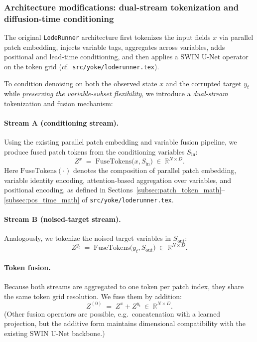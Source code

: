 \documentclass{article} %
\begin{document}
\subsubsection{Architecture modifications: dual-stream tokenization and diffusion-time conditioning}
\label{subsec:arch_mods}

The original \texttt{LodeRunner} architecture first tokenizes the input fields $x$ via parallel patch embedding,
injects variable tags, aggregates across variables, adds positional and lead-time conditioning, and then
applies a SWIN U-Net operator on the token grid (cf.\ \texttt{src/yoke/loderunner.tex}).

To condition denoising on both the observed state $x$ and the corrupted target $y_t$ while \emph{preserving the
variable-subset flexibility}, we introduce a \emph{dual-stream} tokenization and fusion mechanism:

\paragraph{Stream A (conditioning stream).}
Using the existing parallel patch embedding and variable fusion pipeline, we produce fused patch tokens
from the conditioning variables $S_{\mathrm{in}}$:
\[
Z^{x} \;=\; \mathrm{FuseTokens}\big(x,S_{\mathrm{in}}\big)\ \in\ \mathbb{R}^{N\times D}.
\]
Here $\mathrm{FuseTokens}(\cdot)$ denotes the composition of parallel patch embedding, variable identity
encoding, attention-based aggregation over variables, and positional encoding, as defined in
Sections~\ref{subsec:patch_token_math}--\ref{subsec:pos_time_math} of \texttt{src/yoke/loderunner.tex}.

\paragraph{Stream B (noised-target stream).}
Analogously, we tokenize the noised target variables in $S_{\mathrm{out}}$:
\[
Z^{y_t} \;=\; \mathrm{FuseTokens}\big(y_t,S_{\mathrm{out}}\big)\ \in\ \mathbb{R}^{N\times D}.
\]

\paragraph{Token fusion.}
Because both streams are aggregated to one token per patch index, they share the same token grid resolution.
We fuse them by addition:
\begin{equation}
Z^{(0)} \;=\; Z^{x} + Z^{y_t}\ \in\ \mathbb{R}^{N\times D}.
\label{eq:token_fusion}
\end{equation}
(Other fusion operators are possible, e.g.\ concatenation with a learned projection, but the additive form
maintains dimensional compatibility with the existing SWIN U-Net backbone.)
\end{document}
